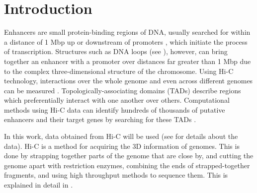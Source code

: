 \chapter{Introduction}\label{chap:introduction}

%
%
%
%
%
%


Enhancers are small protein-binding regions of DNA, usually searched for within
a distance of 1 Mbp up or downstream of promoters
\cite{pennacchio2013enhancers}, which initiate the process of transcription.
Structures such as DNA loops (see ), however, can
bring together an enhancer with a promoter over distances far greater than 1
Mbp \cite{pennacchio2013enhancers} due to the complex three-dimensional
structure of the chromosome. Using Hi-C technology, interactions over the whole
genome \cite{lieberman2009comprehensive} and even across different genomes can
be measured \cite{rao20143d}. Topologically-associating domains (TADs) describe
regions which preferentially interact with one another over others.
Computational methods using Hi-C data can identify hundreds of thousands of
putative enhancers and their target genes by searching for these TADs
\cite{ron2017promoter}.

In this work, data obtained from Hi-C will be used (see 
for details about the data). Hi-C is a method for acquiring the 3D information
of genomes. This is done by strapping together parts of the genome that are
close by, and cutting the genome apart with restriction enzymes, combining the
ends of strapped-together fragments, and using high throughput methods to
sequence them. This is explained in detail in .

